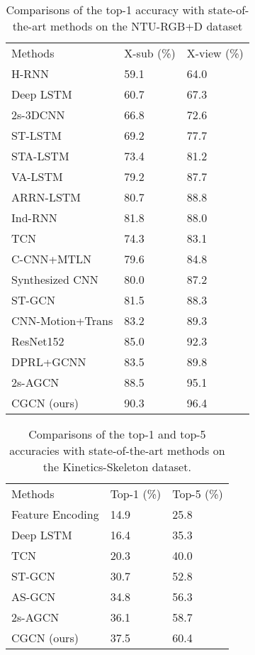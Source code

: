 \documentclass[runningheads]{llncs}
\begin{document}
\begin{table}[!h]
\begin{center}
\caption{Comparisons of the top-1 accuracy with state-of-the-art methods on the NTU-RGB+D dataset}
\label{table2}
\begin{tabular}{lll}
\hline\noalign{\smallskip}
Methods & X-sub (\%)& X-view (\%)\\
\noalign{\smallskip}
\hline
\noalign{\smallskip}
H-RNN \cite{du2015hierarchical}  & 59.1  &64.0 \\
Deep LSTM \cite{Shahroudy_2016_NTURGBD} & 60.7  &67.3\\
2s-3DCNN \cite{liu2017two} &66.8  &72.6\\
ST-LSTM \cite{liu2016spatio} & 69.2  &77.7\\
STA-LSTM \cite{song2017end} &  73.4  &81.2\\
VA-LSTM \cite{zhang2017view} &  79.2  &87.7\\
ARRN-LSTM \cite{li2018skeleton} & 80.7 & 88.8\\
Ind-RNN \cite{li2018independently} &  81.8  &88.0\\
TCN \cite{kim2017interpretable}  &74.3 & 83.1\\
C-CNN+MTLN \cite{ke2017new}  & 79.6 & 84.8\\
Synthesized CNN \cite{liu2017enhanced}  &80.0  &87.2\\
ST-GCN \cite{yan2018spatial}  & 81.5  &88.3\\
CNN-Motion+Trans \cite{du2015skeleton} & 83.2 & 89.3\\
ResNet152 \cite{li2017skeleton}  &85.0 & 92.3\\
DPRL+GCNN \cite{tang2018deep}  & 83.5  &89.8\\
2s-AGCN \cite{shi2019two} &88.5&95.1\\
\hline
CGCN (ours) & 90.3  &96.4\\
\hline
\end{tabular}
\end{center}
\end{table}

\begin{table}[!h]
\begin{center}
\caption{Comparisons of the top-1 and top-5 accuracies with state-of-the-art methods on the Kinetics-Skeleton dataset.}
\label{table3}
\begin{tabular}{lll}
\hline\noalign{\smallskip}
Methods & Top-1 (\%) & Top-5 (\%) \\
\noalign{\smallskip}
\hline
\noalign{\smallskip}
Feature Encoding \cite{fernando2015modeling}& 14.9 &25.8\\
Deep LSTM \cite{Shahroudy_2016_NTURGBD}& 16.4 &35.3\\
TCN \cite{kim2017interpretable} & 20.3 &40.0\\
ST-GCN \cite{yan2018spatial}  & 30.7& 52.8\\
AS-GCN \cite{Li_2019_CVPR} &34.8 &56.3\\
2s-AGCN \cite{shi2019two} &36.1& 58.7\\
\hline
CGCN (ours) & 37.5  &60.4\\
\hline
\end{tabular}
\end{center}
\end{table}
\end{document}
